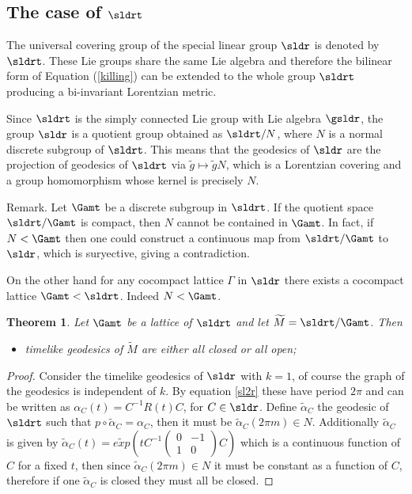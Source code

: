 \documentclass[11pt]{amsart}
\theoremstyle{plain}
\newtheorem{thm}{Theorem}[section]
\theoremstyle{definition}
\theoremstyle{remark}
\begin{document}
\subsection{The case of $\sldrt$}


The universal covering group of the special linear group $\sldr$ is denoted by $\sldrt$. These Lie groups share the same Lie algebra and therefore the bilinear form of Equation (\ref{killing}) can be extended to the whole group $\sldrt$ producing a bi-invariant Lorentzian metric.

Since $\sldrt$ is the simply connected Lie group with Lie algebra $\gsldr$, the group $\sldr$ is a quotient group obtained as $\sldrt/N$, where $N$ is a normal discrete subgroup of $\sldrt$. This means that the geodesics of $\sldr$ are the projection of geodesics of $\sldrt$ via $\widetilde{g} \mapsto \widetilde{g} N$, which is a Lorentzian covering and a group homomorphism whose kernel is precisely $N$.

\smallskip

Remark. Let $\Gamt$ be a discrete subgroup in $\sldrt$. If the quotient space $\sldrt/\Gamt$ is compact, then $N$ cannot be contained in $\Gamt$. In fact, if $N < \Gamt$ then one could construct a continuous map from $\sldrt/\Gamt$  to $\sldr$, which is suryective, giving a contradiction. 

On the other hand for any cocompact lattice $\Gamma$ in $\sldr$ there exists a cocompact lattice $\Gamt<\sldrt$. Indeed $N < \Gamt$. 



\begin{thm}\label{teoremasldr}
Let $\Gamt$ be a lattice of $\sldrt$ and let $\widetilde{M}=\sldrt/\Gamt$. Then
\begin{itemize}
	\item timelike geodesics of $\widetilde{M}$ are either all closed or all open;
\end{itemize}
\end{thm}

\begin{proof}
Consider the timelike geodesics of $\sldr$ with $k=1$, of course the graph of the geodesics is independent of $k$. By equation \ref{sl2r} these have period $2 \pi$ and can be written as $\alpha_C(t)= C^{-1} R(t) C$, for $C \in \sldr$. Define $\widetilde{\alpha}_C$ the geodesic of $\sldrt$ such that $p \circ \widetilde{\alpha}_C = \alpha_C$, then it must be $\widetilde{\alpha}_C(2 \pi m) \in N$. Additionally $\widetilde{\alpha}_C$ is given by $\widetilde{\alpha}_C(t)=\widetilde{exp} \left( t C^{-1} \left(\begin{array}{cc}
0 & -1 \\
1 & 0 \end{array}\right) C \right)$
which is a continuous function of $C$ for a fixed $t$, then since $\widetilde{\alpha}_C(2 \pi m) \in N$ it must be constant as a function of $C$, therefore if one $\widetilde{\alpha}_C$ is closed they must all be closed.
\end{proof}
\end{document}
